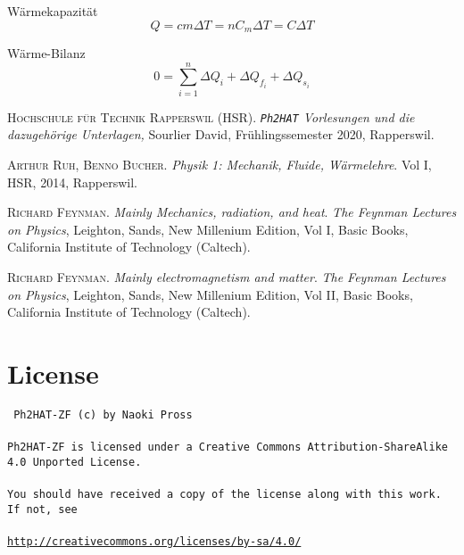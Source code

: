 \documentclass[a4paper, twocolumn]{article}
\numberwithin{equation}{section}
\theoremstyle{hsr-def}
\theoremstyle{hsr-sub}
\begin{document}
W\"armekapazit\"at
\[
    Q = cm\Delta T = n C_m \Delta T = C \Delta T
\]

W\"arme-Bilanz
\[
    0 = \sum_{i = 1}^n \Delta Q_i + \Delta Q_{f_i} + \Delta Q_{s_i}
\]

\begin{thebibliography}{2}
	\textsc{Hochschule f\"ur Technik Rapperswil (HSR)}.
    \textit{\texttt{Ph2HAT} Vorlesungen und die dazugeh\"orige Unterlagen,}
	Sourlier David,
	Fr\"uhlingssemester 2020,
	Rapperswil.

	\textsc{Arthur Ruh, Benno Bucher}.
	\textit{Physik 1: Mechanik, Fluide, W\"armelehre}.
	Vol I, HSR, 2014, Rapperswil.

	\textsc{Richard Feynman}.
	\textit{Mainly Mechanics, radiation, and heat}.
	\textit{The Feynman Lectures on Physics},
	Leighton, Sands,
	New Millenium Edition,
	Vol I,
	Basic Books,
	California Institute of Technology (Caltech).

	\textsc{Richard Feynman}.
	\textit{Mainly electromagnetism and matter}.
	\textit{The Feynman Lectures on Physics},
	Leighton, Sands,
	New Millenium Edition,
	Vol II,
	Basic Books,
	California Institute of Technology (Caltech).
	
\end{thebibliography}


\section*{License}
{ \tt
Ph2HAT-ZF (c) by Naoki Pross
\\\\
Ph2HAT-ZF is licensed under a Creative Commons Attribution-ShareAlike 4.0 Unported License.
\\\\
You should have received a copy of the license along with this work. If not, see 
\\\\
{\small\url{http://creativecommons.org/licenses/by-sa/4.0/}}
}
\end{document}
